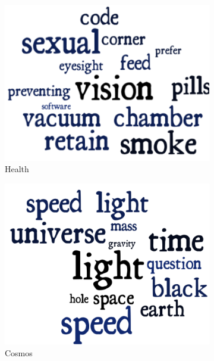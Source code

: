 \begin{figure}[h]
  \begin{subfigure}{0.5\textwidth}
  \centering
\includegraphics[scale=0.5]{images/Health.pdf}
\caption{Health}
\end{subfigure}
  \begin{subfigure}{0.5\textwidth}
  \centering
\includegraphics[scale=0.5]{images/Cosmos.pdf}
\caption{Cosmos}
\end{subfigure}
  \begin{subfigure}{0.5\textwidth}
  \centering

\end{subfigure}
\end{figure}
